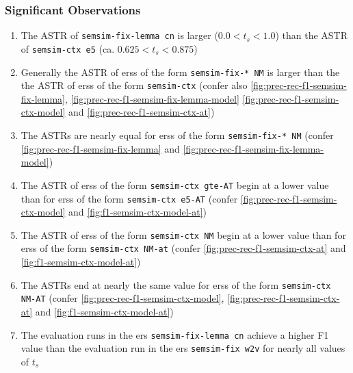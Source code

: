 \documentclass[11pt, numbers=noenddot]{scrreprt}
\newcounter{listcounter}
\begin{document}
\subsubsection{Significant Observations}
\begin{enumerate}[label=\arabic{listcounter}.\arabic*]
	\item The ASTR of \texttt{semsim-fix-lemma cn} is larger (\(0.0 < t_s < 1.0\)) than the ASTR of \texttt{semsim-ctx e5} (ca. \(0.625 < t_s < 0.875\)) \label{obs-itm:astr-lemma-fness-cn-higher-than-cness-e5}
	\item Generally the ASTR of \gls{ers}s of the form \texttt{semsim-fix-* NM} is larger than the the ASTR of \gls{ers}s of the form \texttt{semsim-ctx} (confer also \cref{fig:prec-rec-f1-semsim-fix-lemma}, \cref{fig:prec-rec-f1-semsim-fix-lemma-model} \cref{fig:prec-rec-f1-semsim-ctx-model} and \cref{fig:prec-rec-f1-semsim-ctx-at}) \label{obs-itm:astr-fness-higher-than-cness}
	\item The ASTRs are nearly equal for \gls{ers}s of the form \texttt{semsim-fix-* NM} \label{obs-itm:ASTR-equal-fness} (confer \cref{fig:prec-rec-f1-semsim-fix-lemma} and \cref{fig:prec-rec-f1-semsim-fix-lemma-model}) \label{obs-itm:astr-fness-equal}
	\item The ASTR of \gls{ers}s of the form \texttt{semsim-ctx gte-AT} begin at a lower value than for \gls{ers}s of the form \texttt{semsim-ctx e5-AT} (confer \cref{fig:prec-rec-f1-semsim-ctx-model} and \cref{fig:f1-semsim-ctx-model-at}) \label{obs-itm:astr-cness-gte-starts-earlier}
	\item The ASTR of \gls{ers}s of the form \texttt{semsim-ctx NM} begin at a lower value than for \gls{ers}s of the form \texttt{semsim-ctx NM-at} (confer \cref{fig:prec-rec-f1-semsim-ctx-at} and \cref{fig:f1-semsim-ctx-model-at}) \label{obs-itm:astr-cness-at-starts-earlier}
	\item The ASTRs end at nearly the same value for \gls{ers}s of the form \texttt{semsim-ctx NM-AT} \label{obs-itm:ASTR-equal-fness} (confer \cref{fig:prec-rec-f1-semsim-ctx-model}, \cref{fig:prec-rec-f1-semsim-ctx-at} and \cref{fig:f1-semsim-ctx-model-at}) \label{obs-itm:astr-cness-end-equal}

	\item The evaluation runs in the \gls{ers} \texttt{semsim-fix-lemma cn} achieve a higher F1 value than the evaluation run in the \gls{ers} \texttt{semsim-fix w2v} for nearly all values of \(t_s\) \label{obs-itm:lemma-fness-higher-f1-nearly-always}


\end{enumerate}
\end{document}
